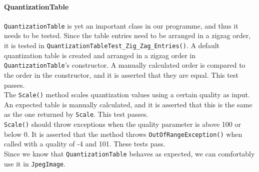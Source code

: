 \paragraph*{QuantizationTable}
\lstinline|QuantizationTable| is yet an important class in our programme, and thus it needs to be tested.
Since the table entries need to be arranged in a zigzag order, it is tested in \lstinline|QuantizationTableTest_Zig_Zag_Entries()|.
A default quantization table is created and arranged in a zigzag order in \lstinline|QuantizationTable|'s constructor.
A manually calculated order is compared to the order in the constructor, and it is asserted that they are equal.
This test passes.\\
The \lstinline|Scale()| method scales quantization values using a certain quality as input.
An expected table is manually calculated, and it is asserted that this is the same as the one returned by \lstinline|Scale|.
This test passes.\\
\lstinline|Scale()| should throw exceptions when the quality parameter is above 100 or below 0.
It is asserted that the method throws \lstinline|OutOfRangeException()| when called with a quality of -4 and 101.
These tests pass.\\
Since we know that \lstinline|QuantizationTable| behaves as expected, we can comfortably use it in \lstinline|JpegImage|.

